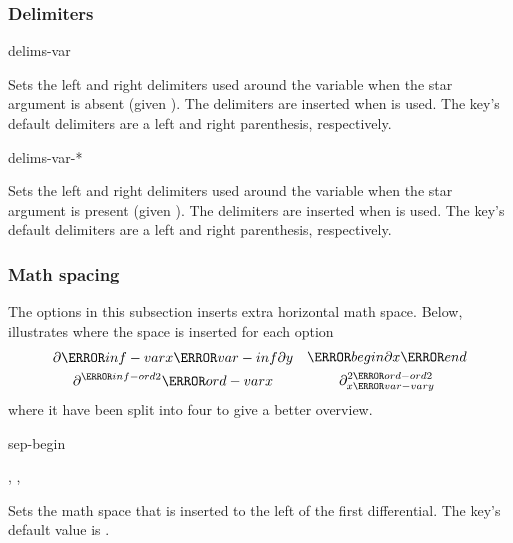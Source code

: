 	\subsubsection*{Delimiters}
	
	\begin{option}{delims-var}
		\begin{values}[default = (~)]
		\end{values}
		Sets the left and right delimiters used around the variable when the star argument is absent (given ). The delimiters are inserted when  is used. The key's default delimiters are a left and right parenthesis, respectively.
	\end{option}
	
	\begin{option}{delims-var-*}
		\begin{values}[default = (~)]
		\end{values}
		Sets the left and right delimiters used around the variable when the star argument is present (given ). The delimiters are inserted when  is used. The key's default delimiters are a left and right parenthesis, respectively.
	\end{option}
	
	\subsubsection*{Math spacing}
	The options in this subsection inserts extra horizontal math space. Below, illustrates where the space is inserted for each option
	\begin{align*}
		\begin{gathered}
			\partial \ms{inf-var} x \ms{var-inf} \partial y \\
			\partial^{ \ms{inf-ord} 2 } \ms{ord-var} x
		\end{gathered}
		&&
		\begin{gathered}
			\ms{begin} \partial x \ms{end} \\
			\partial^{ 2\ms{ord-ord} 2 }_{ x \ms{var-var} y }
		\end{gathered}
	\end{align*}
	where it have been split into four to give a better overview.
	
	\begin{option}{sep-begin}
		\begin{values}[default = \cs{mathop}\{\}\cs{!}]
			, , 
		\end{values}
		Sets the math space that is inserted to the left of the first differential. The key's default value is .
	\end{option}
	
